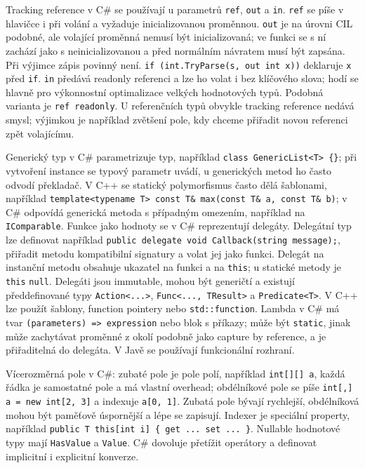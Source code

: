\begin{odpoved}
Tracking reference v C\# se používají u parametrů \texttt{ref}, \texttt{out} a
\texttt{in}. \texttt{ref} se píše v hlavičce i při volání a vyžaduje inicializovanou
proměnnou. \texttt{out} je na úrovni CIL podobné, ale volající proměnná nemusí být
inicializovaná; ve funkci se s ní zachází jako s neinicializovanou a před normálním
návratem musí být zapsána. Při výjimce zápis povinný není. \texttt{if (int.TryParse(s, out
int x))} deklaruje \texttt{x} před \texttt{if}. \texttt{in} předává readonly referenci a
lze ho volat i bez klíčového slova; hodí se hlavně pro výkonnostní optimalizace velkých
hodnotových typů. Podobná varianta je \texttt{ref readonly}. U referenčních typů obvykle
tracking reference nedává smysl; výjimkou je například zvětšení pole, kdy chceme
přiřadit novou referenci zpět volajícímu.

Generický typ v C\# parametrizuje typ, například \texttt{class GenericList<T> \{\}}; při
vytvoření instance se typový parametr uvádí, u generických metod ho často odvodí
překladač. V C++ se statický polymorfismus často dělá šablonami, například
\texttt{template<typename T> const T\& max(const T\& a, const T\& b)}; v C\# odpovídá
generická metoda s případným omezením, například na \texttt{IComparable}. Funkce jako
hodnoty se v C\# reprezentují delegáty. Delegátní typ lze definovat například
\texttt{public delegate void Callback(string message);}, přiřadit metodu kompatibilní
signatury a volat jej jako funkci. Delegát na instanční metodu obsahuje ukazatel na
funkci a na \texttt{this}; u statické metody je \texttt{this} \texttt{null}. Delegáti jsou
immutable, mohou být generičtí a existují předdefinované typy
\texttt{Action<...>}, \texttt{Func<..., TResult>} a \texttt{Predicate<T>}. V C++ lze
použít šablony, function pointery nebo \texttt{std::function}. Lambda v C\# má tvar
\texttt{(parameters) => expression} nebo blok s příkazy; může být \texttt{static}, jinak
může zachytávat proměnné z okolí podobně jako capture by reference, a je přiřaditelná do
delegáta. V Javě se používají funkcionální rozhraní.

Vícerozměrná pole v C\#: zubaté pole je pole polí, například \texttt{int[][] a}, každá
řádka je samostatné pole a má vlastní overhead; obdélníkové pole se píše
\texttt{int[,] a = new int[2, 3]} a indexuje \texttt{a[0, 1]}. Zubatá pole bývají
rychlejší, obdélníková mohou být paměťově úspornější a lépe se zapisují. Indexer je
speciální property, například \texttt{public T this[int i] \{ get ... set ... \}}.
Nullable hodnotové typy mají \texttt{HasValue} a \texttt{Value}. C\# dovoluje přetížit
operátory a definovat implicitní i explicitní konverze.


\end{odpoved}
